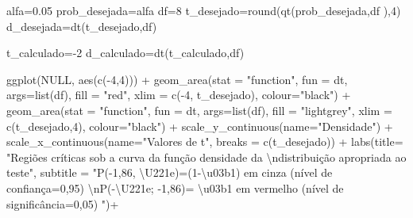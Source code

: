 \documentclass[
]{book}
\newenvironment{Shaded}{\begin{snugshade}}{\end{snugshade}}
\newcommand{\AttributeTok}[1]{\textcolor[rgb]{0.77,0.63,0.00}{#1}}
\newcommand{\ConstantTok}[1]{\textcolor[rgb]{0.00,0.00,0.00}{#1}}
\newcommand{\DecValTok}[1]{\textcolor[rgb]{0.00,0.00,0.81}{#1}}
\newcommand{\FloatTok}[1]{\textcolor[rgb]{0.00,0.00,0.81}{#1}}
\newcommand{\FunctionTok}[1]{\textcolor[rgb]{0.00,0.00,0.00}{#1}}
\newcommand{\NormalTok}[1]{#1}
\newcommand{\OtherTok}[1]{\textcolor[rgb]{0.56,0.35,0.01}{#1}}
\newcommand{\SpecialCharTok}[1]{\textcolor[rgb]{0.00,0.00,0.00}{#1}}
\newcommand{\StringTok}[1]{\textcolor[rgb]{0.31,0.60,0.02}{#1}}
\begin{document}
\begin{Shaded}
\begin{Highlighting}[]
\NormalTok{alfa}\OtherTok{=}\FloatTok{0.05}
\NormalTok{prob\_desejada}\OtherTok{=}\NormalTok{alfa}
\NormalTok{df}\OtherTok{=}\DecValTok{8}
\NormalTok{t\_desejado}\OtherTok{=}\FunctionTok{round}\NormalTok{(}\FunctionTok{qt}\NormalTok{(prob\_desejada,df ),}\DecValTok{4}\NormalTok{)}
\NormalTok{d\_desejada}\OtherTok{=}\FunctionTok{dt}\NormalTok{(t\_desejado,df)}

\NormalTok{t\_calculado}\OtherTok{=}\SpecialCharTok{{-}}\DecValTok{2}
\NormalTok{d\_calculado}\OtherTok{=}\FunctionTok{dt}\NormalTok{(t\_calculado,df)}


\FunctionTok{ggplot}\NormalTok{(}\ConstantTok{NULL}\NormalTok{, }\FunctionTok{aes}\NormalTok{(}\FunctionTok{c}\NormalTok{(}\SpecialCharTok{{-}}\DecValTok{4}\NormalTok{,}\DecValTok{4}\NormalTok{))) }\SpecialCharTok{+}
  \FunctionTok{geom\_area}\NormalTok{(}\AttributeTok{stat =} \StringTok{"function"}\NormalTok{, }
            \AttributeTok{fun =}\NormalTok{ dt,}
            \AttributeTok{args=}\FunctionTok{list}\NormalTok{(df), }
            \AttributeTok{fill =} \StringTok{"red"}\NormalTok{, }
            \AttributeTok{xlim =} \FunctionTok{c}\NormalTok{(}\SpecialCharTok{{-}}\DecValTok{4}\NormalTok{, t\_desejado),}
            \AttributeTok{colour=}\StringTok{"black"}\NormalTok{) }\SpecialCharTok{+}
  \FunctionTok{geom\_area}\NormalTok{(}\AttributeTok{stat =} \StringTok{"function"}\NormalTok{, }
            \AttributeTok{fun =}\NormalTok{ dt, }
            \AttributeTok{args=}\FunctionTok{list}\NormalTok{(df), }
            \AttributeTok{fill =} \StringTok{"lightgrey"}\NormalTok{, }
            \AttributeTok{xlim =} \FunctionTok{c}\NormalTok{(t\_desejado,}\DecValTok{4}\NormalTok{),}
            \AttributeTok{colour=}\StringTok{"black"}\NormalTok{) }\SpecialCharTok{+}
  \FunctionTok{scale\_y\_continuous}\NormalTok{(}\AttributeTok{name=}\StringTok{"Densidade"}\NormalTok{) }\SpecialCharTok{+}
  \FunctionTok{scale\_x\_continuous}\NormalTok{(}\AttributeTok{name=}\StringTok{"Valores de t"}\NormalTok{, }\AttributeTok{breaks =} \FunctionTok{c}\NormalTok{(t\_desejado))  }\SpecialCharTok{+}
  \FunctionTok{labs}\NormalTok{(}\AttributeTok{title=} 
         \StringTok{"Regiões críticas sob a curva da função densidade da }\SpecialCharTok{\textbackslash{}n}\StringTok{distribuição apropriada ao teste"}\NormalTok{, }
       \AttributeTok{subtitle =} \StringTok{"P({-}1,86, \textbackslash{}U221e)=(1{-}\textbackslash{}u03b1) em cinza (nível de confiança=0,95) }\SpecialCharTok{\textbackslash{}n}\StringTok{P({-}\textbackslash{}U221e; {-}1,86)= \textbackslash{}u03b1 em vermelho (nível de significância=0,05) "}\NormalTok{)}\SpecialCharTok{+} 

\end{Highlighting}
\end{Shaded}
\end{document}

